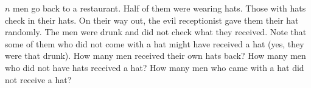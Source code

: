   $n$ men go back to a restaurant.
  Half of them were wearing hats.
  Those with hats check in their
  hats.
  On their way out, 
  the evil receptionist gave them their hat randomly.
  The men were drunk and did not check what they received.
  Note that some of them who did not come with a hat might have
  received a hat (yes, they were that drunk).
  How many men received their own hats back?
  How many men who did not have hats received a hat?
  How many men who came with a hat did not receive a hat?
